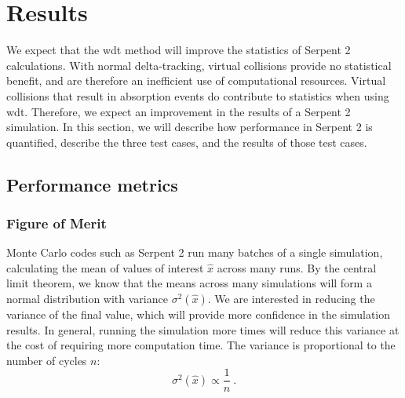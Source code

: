 \chapter{Results}
\label{chap:results}
We expect that the \gls{wdt} method will improve the statistics of
Serpent 2 calculations. With normal delta-tracking, virtual collisions
provide no statistical benefit, and are therefore an inefficient use
of computational resources. Virtual collisions that result in
absorption events do contribute to statistics when using
\gls{wdt}. Therefore, we expect an improvement in the results of a
Serpent 2 simulation. In this section, we will describe how
performance in Serpent 2 is quantified, describe the three test cases,
and the results of those test cases.

\section{Performance metrics}
\label{sec:fom}

\subsection{Figure of Merit}
\label{sec:fom}

Monte Carlo codes such as Serpent 2 run many batches of a single
simulation, calculating the mean of values of interest $\hat{x}$
across many runs. 
By the central limit theorem, we know that the
means across many simulations will form a normal distribution with
variance $\sigma^2(\hat{x})$. We are interested in reducing the
variance of the final value, which will provide more confidence in the
simulation results. In general, running the simulation more times will
reduce this variance at the cost of requiring more computation
time. The variance is proportional to the number of cycles $n$:
\begin{equation}
\label{eq:variance}
  \sigma^2(\hat{x}) \propto \frac{1}{n}\:.
\end{equation}

